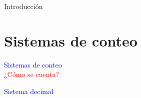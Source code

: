 \documentclass[10pt,xcolor={dvipsnames}]{beamer}
\begin{document}
\begin{frame}{Introducción}
\begin{center}
\end{center}
\end{frame}



\section{Sistemas de conteo}

\begin{frame}
\begin{center}
\Huge{\textcolor{blue}{Sistemas de conteo}} \\ \pause
\Large{\textcolor{red}{¿Cómo se cuenta?}}
\end{center}
\end{frame}


\begin{frame}
\begin{center}
\Huge{\textcolor{blue}{Sistema decimal}}
\end{center}
\end{frame}
\end{document}
